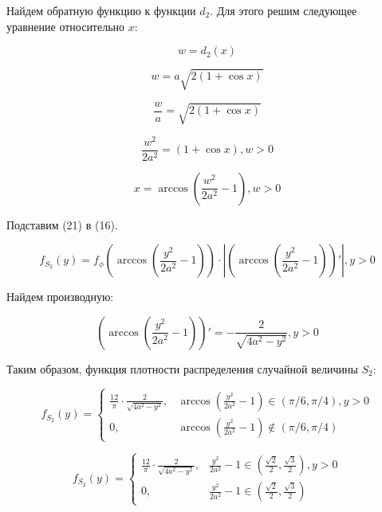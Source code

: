 \documentclass[]{article}
\begin{document}
	\vspace{10pt}
	
	Найдем обратную функцию к функции $d_2$. Для этого решим следующее уравнение относительно $x$:
	
	\begin{equation}
	w = d_2(x)
	\end{equation}
	
	\begin{equation}
	w = a\sqrt{2(1+\cos x)}
	\end{equation}
	
	\begin{equation}
	\frac{w}{a} = \sqrt{2(1+\cos x)}
	\end{equation}
	
	\begin{equation}
	\frac{w^2}{2a^2} = (1+\cos x), w > 0
	\end{equation}
	
	\begin{equation}
	x = \arccos(\frac{w^2}{2a^2} - 1), w > 0
	\end{equation}
	
	\vspace{10pt}
	
	Подставим (21) в (16).
	
	\begin{equation}
	f_{S_2}(y) = f_\phi(\arccos(\frac{y^2}{2a^2} - 1)) \cdot |(\arccos(\frac{y^2}{2a^2} - 1))'|, y > 0
	\end{equation}
	
	Найдем производную:
	
	\begin{equation}
	(\arccos(\frac{y^2}{2a^2} - 1))' = - \frac{2}{\sqrt{4 a ^ 2 - y ^ 2}}, y > 0
	\end{equation}
	
	\vspace{10pt}
	
	Таким образом, функция плотности распределения случайной величины $S_2$:
	
	\begin{equation}
	f_{S_2}(y) = 
	\begin{cases}
	\frac{12}{\pi} \cdot \frac{2}{\sqrt{4 a ^ 2 - y ^ 2}}, & \arccos(\frac{y^2}{2a^2} - 1)  \in (\pi/6, \pi/4), y > 0\\
	0, & \arccos(\frac{y^2}{2a^2} - 1) \notin (\pi/6, \pi/4)
	\end{cases}
	\end{equation}
	
	\begin{equation}
	f_{S_2}(y) = 
	\begin{cases}
	\frac{12}{\pi} \cdot \frac{2}{\sqrt{4 a ^ 2 - y ^ 2}}, & \frac{y^2}{2a^2} -1  \in (\frac{\sqrt2}{2}, \frac{\sqrt3}{2}), y > 0\\
	0, & \frac{y^2}{2a^2} - 1 \in (\frac{\sqrt2}{2}, \frac{\sqrt3}{2})
	\end{cases}
	\end{equation}
	
\end{document}
